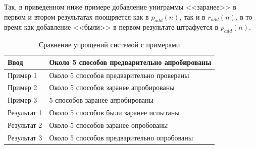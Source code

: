 Так, в приведенном ниже примере добавление униграммы <<заранее>> в первом и втором результатах поощряется как в $p_{add}(n)$, так и в $r_{add}(n)$, в то время как добавление <<были>> в первом результате штрафуется в $p_{add}(n)$.

\begin{center}
	\captionsetup{justification=raggedleft,singlelinecheck=off}
\begin{table}[h!]
	\centering
	\caption{Сравнение упрощений системой с примерами}
	\label{tabular:example}
	\begin{tabular}{|l|l|}
		\hline
		Ввод        & Около 5 способов предварительно  апробированы \\ \hline
		Пример 1    & Около 5 способов предварительно проверены     \\ \hline
		Пример 2    & Около 5 способов заранее апробированы         \\ \hline
		Пример 3    & 5 способов заранее апробированы               \\ \hline
		Результат 1 & Около 5 способов были заранее испытаны        \\ \hline
		Результат 2 & Около 5 способов заранее опробованы           \\ \hline
		Результат 3 & Около 5 способов предварительно опробованы    \\ \hline
	\end{tabular}
\end{table}
\end{center}

